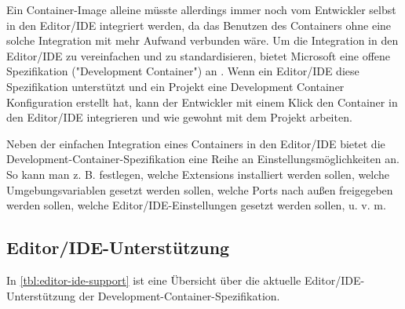 Ein Container-Image alleine müsste allerdings immer noch vom Entwickler selbst in den Editor/IDE integriert werden, da das Benutzen des Containers ohne eine solche Integration mit mehr Aufwand verbunden wäre. Um die Integration in den Editor/IDE zu vereinfachen und zu standardisieren, bietet Microsoft eine offene Spezifikation ("Development Container") an \cite{microsoftDevelopmentContainers}. Wenn ein Editor/IDE diese Spezifikation unterstützt und ein Projekt eine Development Container Konfiguration erstellt hat, kann der Entwickler mit einem Klick den Container in den Editor/IDE integrieren und wie gewohnt mit dem Projekt arbeiten.

Neben der einfachen Integration eines Containers in den Editor/IDE bietet die Development-Container-Spezifikation eine Reihe an Einstellungsmöglichkeiten an. So kann man z. B. festlegen, welche Extensions installiert werden sollen, welche Umgebungsvariablen gesetzt werden sollen, welche Ports nach außen freigegeben werden sollen, welche Editor/IDE-Einstellungen gesetzt werden sollen, u. v. m.

\pagebreak

\subsection{Editor/IDE-Unterstützung}

In \cref{tbl:editor-ide-support} ist eine Übersicht über die aktuelle Editor/IDE-Unterstützung der Development-Container-Spezifikation.

